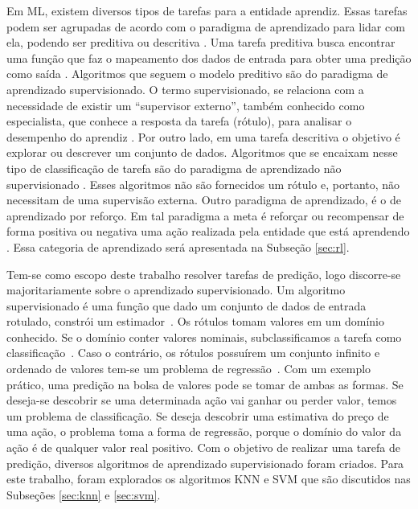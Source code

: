 Em \acrshort{ML}, existem diversos tipos de tarefas para a entidade aprendiz. Essas tarefas podem ser agrupadas de acordo com o paradigma de aprendizado para lidar com ela, podendo ser preditiva ou descritiva \cite{faceli2011inteligencia}. Uma tarefa preditiva busca encontrar uma função que faz o mapeamento dos dados de entrada para obter uma predição como saída \cite{modern_approach}. Algoritmos que seguem o modelo preditivo são do paradigma de aprendizado supervisionado. O termo supervisionado, se relaciona com a necessidade de existir um ``supervisor externo'', também conhecido como especialista, que conhece a resposta da tarefa (rótulo), para analisar o desempenho do aprendiz \cite{faceli2011inteligencia}. Por outro lado, em uma tarefa descritiva o objetivo é explorar ou descrever um conjunto de dados. Algoritmos que se encaixam nesse tipo de classificação de tarefa são do paradigma de aprendizado não supervisionado \cite{faceli2011inteligencia}. Esses algoritmos não são fornecidos um rótulo \cite{modern_approach} e, portanto, não necessitam de uma supervisão externa. Outro paradigma de aprendizado, é o de aprendizado por reforço. Em tal paradigma a meta é reforçar ou recompensar de forma positiva ou negativa uma ação realizada pela entidade que está aprendendo \cite{faceli2011inteligencia}. Essa categoria de aprendizado será apresentada na Subseção \ref{sec:rl}.

Tem-se como escopo deste trabalho resolver tarefas de predição, logo discorre-se majoritariamente sobre o aprendizado supervisionado. Um algoritmo supervisionado é uma função que dado um conjunto de dados de entrada rotulado, constrói um estimador~\cite{faceli2011inteligencia}. Os rótulos tomam valores em um domínio conhecido. Se o domínio conter valores nominais, subclassificamos a tarefa como classificação~\cite{modern_approach}. Caso o contrário, os rótulos possuírem um conjunto infinito e ordenado de valores tem-se um problema de regressão~\cite{faceli2011inteligencia}. Com um exemplo prático, uma predição na bolsa de valores pode se tomar de ambas as formas. Se deseja-se descobrir se uma determinada ação vai ganhar ou perder valor, temos um problema de classificação. Se deseja descobrir uma estimativa do preço de uma ação, o problema toma a forma de regressão, porque o domínio do valor da ação é de qualquer valor real positivo. Com o objetivo de realizar uma tarefa de predição, diversos algoritmos de aprendizado supervisionado foram criados. Para este trabalho, foram explorados os algoritmos \acrlong{KNN} e \acrlong{SVM} que são discutidos nas Subseções \ref{sec:knn} e \ref{sec:svm}.

